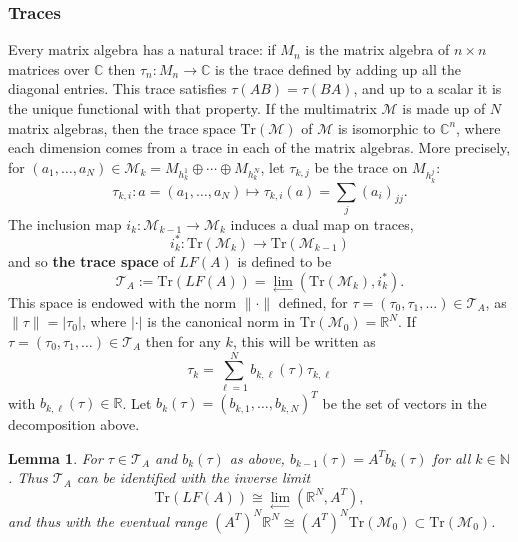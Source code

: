 \documentclass[12pt]{amsart}
\theoremstyle{plain}
\newtheorem{lemma}{Lemma}[section]
\theoremstyle{definition}
\begin{document}
\subsubsection{Traces}
\label{subsubsec:traces}
Every matrix algebra has a natural trace: if $M_n$ is the matrix algebra of $n\times n$ matrices over $\mathbb{C}$ then $\tau_n:M_n\rightarrow \mathbb{C}$ is the trace defined by adding up all the diagonal entries. This trace satisfies $\tau(AB) = \tau(BA)$, and up to a scalar it is the unique functional with that property. If the multimatrix $\mathcal{M}$ is made up of $N$ matrix algebras, then the trace space $\mathrm{Tr}(\mathcal{M})$ of $\mathcal{M}$ is isomorphic to $\mathbb{C}^n$, where each dimension comes from a trace in each of the matrix algebras. More precisely, for $(a_1,\dots, a_N)\in \mathcal{M}_k  = M_{h_k^1}\oplus \cdots \oplus M_{h_k^N}$, let $\tau_{k,j}$ be the trace on $M_{h_k^j}$:
$$\tau_{k,i}: a = (a_1,\dots, a_N) \mapsto \tau_{k,i}(a) = \sum_{j} (a_i)_{jj}.$$
The inclusion map $i_k:\mathcal{M}_{k-1} \rightarrow \mathcal{M}_k $ induces a dual map on traces,
$$i_k^*:\mathrm{Tr}(\mathcal{M}_{k} )\rightarrow \mathrm{Tr}(\mathcal{M}_{k-1} )$$
and so \textbf{the trace space} of $LF(A)$ is defined to be
\begin{equation}
    \label{eqn:invLim}
    \mathcal{T} _A:= \mathrm{Tr}(LF(A)) =  \lim_{\leftarrow} \left(\mathrm{Tr}(\mathcal{M}_k ),i_k^*\right).
\end{equation}
This space is endowed with the norm $\|\cdot\|$ defined, for $\tau = (\tau_0,\tau_1,\dots)\in\mathcal{T} _A$, as $\|\tau\| = |\tau_0|$, where $|\cdot|$ is the canonical norm in $\mathrm{Tr}(\mathcal{M}_0 ) = \mathbb{R}^N$. If $\tau = (\tau_0,\tau_1,\dots)\in \mathcal{T} _A$ then for any $k$, this will be written as
\begin{equation}
\label{eqn:trace}
\tau_k = \sum_{\ell = 1}^N b_{k,\ell}(\tau)\tau_{k,\ell}
\end{equation}
with $b_{k,\ell}(\tau)\in\mathbb{R}$. Let $b_k(\tau) = (b_{k,1},\dots, b_{k,N})^T$ be the set of vectors in the decomposition above.
\begin{lemma}
    \label{lem:bs}
    For $\tau\in \mathcal{T} _A$ and $b_k(\tau)$ as above, $b_{k-1}(\tau) = A^T b_{k}(\tau)$ for all $k\in\mathbb{N}$. Thus $\mathcal{T} _A$ can be identified with the inverse limit
    $$\mathrm{Tr}(LF(A))\cong \lim_{\leftarrow }\left(\mathbb{R}^N, A^T\right),$$
    and thus with the eventual range $(A^T)^N \mathbb{R}^N\cong (A^T)^N\mathrm{Tr}(\mathcal{M} _0) \subset \mathrm{Tr}(\mathcal{M} _0)$.
\end{lemma}
\end{document}
